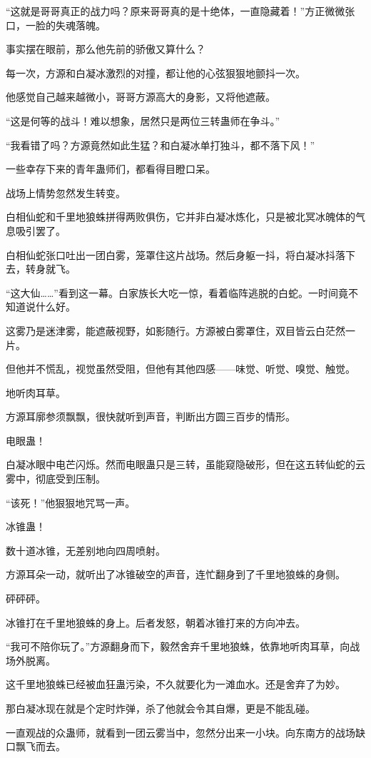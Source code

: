 \begin{this_body}
“这就是哥哥真正的战力吗？原来哥哥真的是十绝体，一直隐藏着！”方正微微张口，一脸的失魂落魄。

事实摆在眼前，那么他先前的骄傲又算什么？

每一次，方源和白凝冰激烈的对撞，都让他的心弦狠狠地颤抖一次。

他感觉自己越来越微小，哥哥方源高大的身影，又将他遮蔽。

“这是何等的战斗！难以想象，居然只是两位三转蛊师在争斗。”

“我看错了吗？方源竟然如此生猛？和白凝冰单打独斗，都不落下风！”

一些幸存下来的青年蛊师们，都看得目瞪口呆。

战场上情势忽然发生转变。

白相仙蛇和千里地狼蛛拼得两败俱伤，它并非白凝冰炼化，只是被北冥冰魄体的气息吸引罢了。

白相仙蛇张口吐出一团白雾，笼罩住这片战场。然后身躯一抖，将白凝冰抖落下去，转身就飞。

“这大仙……”看到这一幕。白家族长大吃一惊，看着临阵逃脱的白蛇。一时间竟不知道说什么好。

这雾乃是迷津雾，能遮蔽视野，如影随行。方源被白雾罩住，双目皆云白茫然一片。

但他并不慌乱，视觉虽然受阻，但他有其他四感——味觉、听觉、嗅觉、触觉。

地听肉耳草。

方源耳廓参须飘飘，很快就听到声音，判断出方圆三百步的情形。

电眼蛊！

白凝冰眼中电芒闪烁。然而电眼蛊只是三转，虽能窥隐破形，但在这五转仙蛇的云雾中，彻底受到压制。

“该死！”他狠狠地咒骂一声。

冰锥蛊！

数十道冰锥，无差别地向四周喷射。

方源耳朵一动，就听出了冰锥破空的声音，连忙翻身到了千里地狼蛛的身侧。

砰砰砰。

冰锥打在千里地狼蛛的身上。后者发怒，朝着冰锥打来的方向冲去。

“我可不陪你玩了。”方源翻身而下，毅然舍弃千里地狼蛛，依靠地听肉耳草，向战场外脱离。

这千里地狼蛛已经被血狂蛊污染，不久就要化为一滩血水。还是舍弃了为妙。

那白凝冰现在就是个定时炸弹，杀了他就会令其自爆，更是不能乱碰。

一直观战的众蛊师，就看到一团云雾当中，忽然分出来一小块。向东南方的战场缺口飘飞而去。


\end{this_body}
